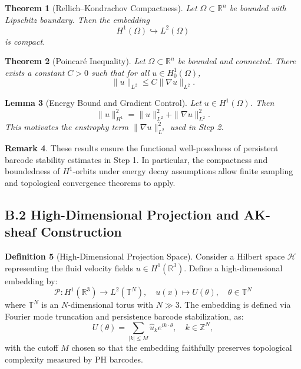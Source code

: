 \documentclass[11pt]{article}
\newtheorem{theorem}{Theorem}[section]
\newtheorem{lemma}[theorem]{Lemma}
\theoremstyle{definition}
\newtheorem{definition}[theorem]{Definition}
\newtheorem{remark}[theorem]{Remark}
\begin{document}
\begin{theorem}[Rellich--Kondrachov Compactness]
Let \( \Omega \subset \mathbb{R}^n \) be bounded with Lipschitz boundary. Then the embedding
\[
H^1(\Omega) \hookrightarrow L^2(\Omega)
\]
is compact.
\end{theorem}

\begin{theorem}[Poincar\'e Inequality]
Let \( \Omega \subset \mathbb{R}^n \) be bounded and connected. There exists a constant \( C > 0 \) such that for all \( u \in H^1_0(\Omega) \),
\[
\|u\|_{L^2} \leq C \|\nabla u\|_{L^2}.
\]
\end{theorem}

\begin{lemma}[Energy Bound and Gradient Control]
Let \( u \in H^1(\Omega) \). Then
\[
\|u\|_{H^1}^2 = \|u\|_{L^2}^2 + \|\nabla u\|_{L^2}^2.
\]
This motivates the enstrophy term \( \|\nabla u\|_{L^2}^2 \) used in Step 2.
\end{lemma}

\begin{remark}
These results ensure the functional well-posedness of persistent barcode stability estimates in Step 1. In particular, the compactness and boundedness of \( H^1 \)-orbits under energy decay assumptions allow finite sampling and topological convergence theorems to apply.
\end{remark}

\subsection*{B.2 High-Dimensional Projection and AK-sheaf Construction}

\begin{definition}[High-Dimensional Projection Space]
Consider a Hilbert space \( \mathcal{H} \) representing the fluid velocity fields \( u \in H^1(\mathbb{R}^3) \). Define a high-dimensional embedding by:
\[
\mathcal{P} : H^1(\mathbb{R}^3) \longrightarrow L^2(\mathbb{T}^N), \quad u(x) \mapsto U(\theta), \quad \theta \in \mathbb{T}^N
\]
where \( \mathbb{T}^N \) is an \( N \)-dimensional torus with \( N \gg 3 \). The embedding is defined via Fourier mode truncation and persistence barcode stabilization, as:
\[
U(\theta) = \sum_{|k|\leq M} \hat{u}_k e^{i k \cdot \theta}, \quad k \in \mathbb{Z}^N,
\]
with the cutoff \( M \) chosen so that the embedding faithfully preserves topological complexity measured by PH barcodes.
\end{definition}
\end{document}
